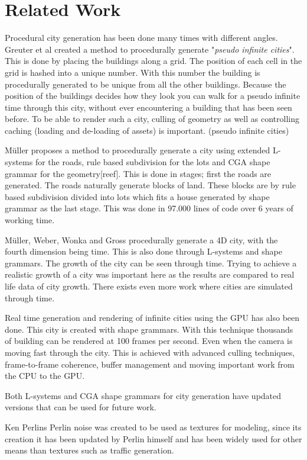 \section{Related Work}
Procedural city generation has been done many times with different angles. Greuter et al\cite{PseudoInfiniteCities} created a method to procedurally generate "\textit{pseudo infinite cities}". This is done by placing the buildings along a grid. The position of each cell in the grid is hashed into a unique number. With this number the building is procedurally generated to be unique from all the other buildings. Because the position of the buildings decides how they look you can walk for a pseudo infinite time through this city, without ever encountering a building that has been seen before. To be able to render such a city, culling of geometry as well as controlling caching (loading and de-loading of assets) is important. (pseudo infinite cities)

\par 
M\"uller proposes a method to procedurally generate a city using extended L-systems for the roads, rule based subdivision for the lots and CGA shape grammar for the geometry[reef]. This is done in stages; first the roads are generated. The roads naturally generate blocks of land. These blocks are by rule based subdivision divided into lots which fits a house generated by shape grammar as the last stage. This was done in 97.000 lines of code over 6 years of working time. \cite{ProceduralModeling}\cite{ProceduralModeling6}

\par
M\"uller, Weber, Wonka and Gross procedurally generate a 4D city, with the fourth dimension being time. This is also done through L-systems and shape grammars. The growth of the city can be seen through time. Trying to achieve a realistic growth of a city was important here as the results are compared to real life data of city growth. \cite{4DCities} There exists even more work where cities are simulated through time. \cite{AutonomousTimeVarying}


\par
Real time generation and rendering of infinite cities using the GPU has also been done\cite{InfiniteCities}. This city is created with shape grammars. With this technique thousands of building can be rendered at 100 frames per second. Even when the camera is moving fast through the city. This is achieved with advanced culling techniques, frame-to-frame coherence, buffer management and moving important work from the CPU to the GPU.

\par
Both L-systems and CGA shape grammars for city generation have updated versions that can be used for future work. \cite{InteractiveProceduralStreet}\cite{AdvancedProceduralModel}

\par
Ken Perlins Perlin noise was created to be used as textures for modeling, since its creation it has been updated by Perlin himself and has been widely used for other means than textures such as traffic generation. \cite{PerlinNoise}\cite{TrafficGenerator}